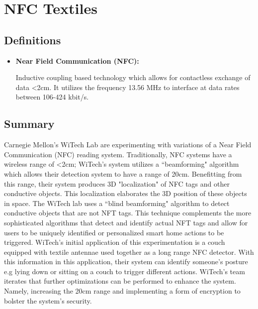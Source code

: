 \documentclass{article}
\begin{document}
\section*{NFC Textiles}


\subsection*{Definitions}

\begin{itemize}
  \item \textbf{Near Field Communication (NFC):}

  Inductive coupling based technology which allows for contactless exchange of data <2cm. 
  It utilizes the frequency 13.56 MHz to interface at data rates between 106-424 kbit/s.
\end{itemize}



\subsection*{Summary}
Carnegie Mellon's WiTech Lab are experimenting with variations of a Near Field Communication (NFC) reading system.
Traditionally, NFC systems have a wireless range of <2cm; WiTech's system utilizes a ``beamforming" algorithm
which allows their detection system to have a range of 20cm.
Benefitting from this range, their system produces 3D "localization" of NFC tags and other conductive objects. 
This localization elaborates the 3D position 
of these objects in space.
The WiTech lab uses a ``blind beamforming" algorithm to detect conductive objects that are 
not NFT tags. This technique complements the more sophisticated algorithms that detect and identify
actual NFT tags and allow for users to be uniquely identified or personalized smart home actions to be triggered.
WiTech's initial application of this experimentation is a couch equipped with textile 
antennae used together as a long range NFC detector. 
With this information in this application, their system can identify someone's posture e.g lying down 
or sitting on a couch to trigger different actions.
 WiTech's team iterates that
further optimizations can be performed to enhance the system. Namely, 
increasing the 20cm range and implementing a 
form of encryption to bolster the system's security.
\end{document}
